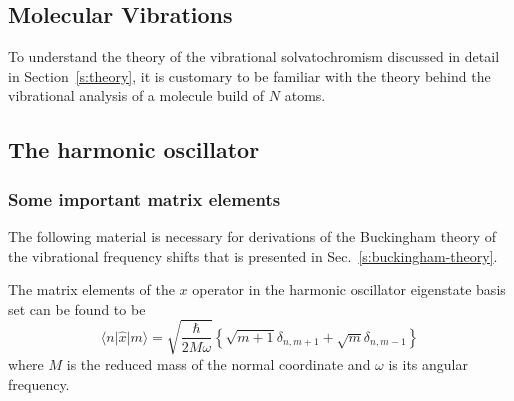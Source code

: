 \documentclass[a4paper,titlepage,twoside,fleqn,12pt]{book}
\begin{document}

\begin{appendices}

\chapter{Molecular Vibrations\label{a:vibrational-analysis}}

To understand the theory of the vibrational solvatochromism 
discussed in detail in Section~\ref{s:theory}, it is customary
to be familiar with the theory behind the vibrational analysis
of a molecule build of $N$ atoms.

\section{The harmonic oscillator\label{a:harmonic-oscillator}}

\subsection{Some important matrix elements\label{a:matrix-elements}}

The following material is necessary for derivations of the Buckingham theory
of the vibrational frequency shifts that is presented in Sec.~\ref{s:buckingham-theory}. 

The matrix elements of the $x$ operator in the harmonic oscillator eigenstate basis set
can be found to be
%
\begin{equation}
\label{ea:mxn}
\langle n \vert \hat{x} \vert m \rangle = 
\sqrt{
\frac{\hbar}{2M\omega}
}
\left\{ 
   \sqrt{m+1} \delta_{n,m+1} + \sqrt{m} \delta_{n,m-1}
\right\}
\end{equation}
%
\noindent where $M$ is the reduced mass of the normal coordinate and $\omega$ is its 
angular frequency.


\end{appendices}
\end{document}

